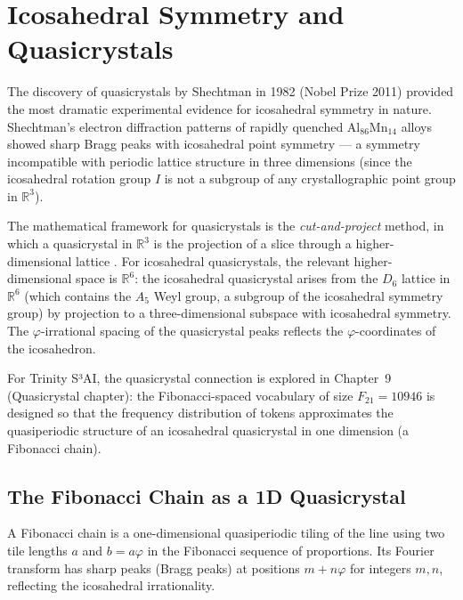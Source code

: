 
\section{Icosahedral Symmetry and Quasicrystals}
\label{sec:quasicrystals}

The discovery of quasicrystals by Shechtman in 1982 (Nobel Prize 2011) provided
the most dramatic experimental evidence for icosahedral symmetry in nature.
Shechtman's electron diffraction patterns of rapidly quenched $\text{Al}_{86}\text{Mn}_{14}$
alloys showed sharp Bragg peaks with icosahedral point symmetry — a symmetry
incompatible with periodic lattice structure in three dimensions (since the
icosahedral rotation group $I$ is not a subgroup of any crystallographic point
group in $\mathbb{R}^3$).

The mathematical framework for quasicrystals is the \emph{cut-and-project} method,
in which a quasicrystal in $\mathbb{R}^3$ is the projection of a slice through
a higher-dimensional lattice \cite{cromwell_polyhedra}.  For icosahedral quasicrystals, the
relevant higher-dimensional space is $\mathbb{R}^6$: the icosahedral quasicrystal
arises from the $D_6$ lattice in $\mathbb{R}^6$ (which contains the $A_5$ Weyl
group, a subgroup of the icosahedral symmetry group) by projection to a
three-dimensional subspace with icosahedral symmetry.  The $\varphi$-irrational
spacing of the quasicrystal peaks reflects the $\varphi$-coordinates of the
icosahedron.

For Trinity S³AI, the quasicrystal connection is explored in Chapter~9 (Quasicrystal
chapter): the Fibonacci-spaced vocabulary of size $F_{21} = 10946$ is designed
so that the frequency distribution of tokens approximates the quasiperiodic
structure of an icosahedral quasicrystal in one dimension (a Fibonacci chain).

\subsection{The Fibonacci Chain as a 1D Quasicrystal}
\label{sec:fib-chain}

A Fibonacci chain is a one-dimensional quasiperiodic tiling of the line using
two tile lengths $a$ and $b = a\varphi$ in the Fibonacci sequence of
proportions.  Its Fourier transform has sharp peaks (Bragg peaks) at positions
$m + n\varphi$ for integers $m, n$, reflecting the icosahedral irrationality.

